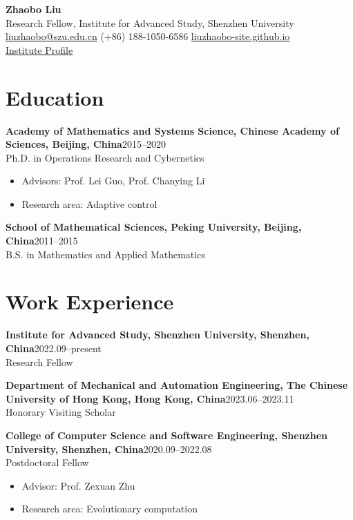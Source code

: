 \documentclass[11pt,a4paper]{article}
\newcommand{\cvitem}[2]{
  \textbf{#1}\hfill #2
}
\begin{document}
{\LARGE \textbf{Zhaobo Liu}}\\[4pt]
Research Fellow, Institute for Advanced Study, Shenzhen University\\
\href{mailto:liuzhaobo@szu.edu.cn}{liuzhaobo@szu.edu.cn} \quad
(+86) 188-1050-6586 \quad
\href{https://liuzhaobo-site.github.io}{liuzhaobo-site.github.io}\\
\href{https://ias.szu.edu.cn/info/1107/3149.htm}{Institute Profile}

\section{Education}

\cvitem{Academy of Mathematics and Systems Science, Chinese Academy of Sciences, Beijing, China}{2015--2020}\\
Ph.D. in Operations Research and Cybernetics
\begin{itemize}
  \item Advisors: Prof. Lei Guo, Prof. Chanying Li
  \item Research area: Adaptive control
\end{itemize}

\cvitem{School of Mathematical Sciences, Peking University, Beijing, China}{2011--2015}\\
B.S. in Mathematics and Applied Mathematics

\section{Work Experience}

\cvitem{Institute for Advanced Study, Shenzhen University, Shenzhen, China}{2022.09--present}\\
Research Fellow

\cvitem{Department of Mechanical and Automation Engineering, The Chinese University of Hong Kong, Hong Kong, China}{2023.06--2023.11}\\
Honorary Visiting Scholar

\cvitem{College of Computer Science and Software Engineering, Shenzhen University, Shenzhen, China}{2020.09--2022.08}\\
Postdoctoral Fellow
\begin{itemize}
  \item Advisor: Prof. Zexuan Zhu
  \item Research area: Evolutionary computation
\end{itemize}
\end{document}
